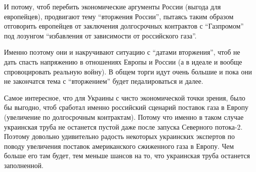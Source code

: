 И потому, чтоб перебить экономические аргументы России (выгода для европейцев),
продвигают тему \enquote{вторжения России}, пытаясь таким образом отговорить европейцев
от заключения долгосрочных контрактов с \enquote{Газпромом} под лозунгом \enquote{избавления от
зависимости от российского газа}.

Именно поэтому они и накручивают ситуацию с \enquote{датами вторжения}, чтоб не дать
спасть напряжению в отношениях Европы и России (а в идеале и вообще
спровоцировать реальную войну). В общем торги идут очень большие и пока они не
закончатся тема с \enquote{вторжением} будет педалироваться и далее.

Самое интересное, что для Украины с чисто экономической точки зрения, было бы
выгодно, чтоб сработал именно российский сценарий поставок газа в Европу
(увеличение по долгосрочным контрактам). Потому что именно в таком случае
украинская труба не останется пустой даже после запуска Северного потока-2.
Поэтому довольно удивительно радость некоторых украинских экспертов по поводу
увеличения поставок американского сжиженного газа в Европу. Чем больше его там
будет, тем меньше шансов на то, что украинская труба останется заполненной. 
